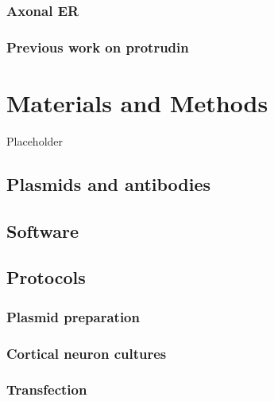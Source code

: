 \documentclass[
  12pt,
  a4paper,
]{book}
\begin{document}
\hypertarget{intro-ptdn-axonalER}{%
\subsection{Axonal ER}\label{intro-ptdn-axonalER}}

\hypertarget{previous-work-on-protrudin}{%
\subsection{Previous work on protrudin}\label{previous-work-on-protrudin}}

\hypertarget{METHODS}{%
\chapter*{Materials and Methods}\label{METHODS}}

Placeholder

\hypertarget{plasmids-and-antibodies}{%
\section{Plasmids and antibodies}\label{plasmids-and-antibodies}}

\hypertarget{software}{%
\section{Software}\label{software}}

\hypertarget{protocols}{%
\section{Protocols}\label{protocols}}

\hypertarget{plasmid-prep}{%
\subsection{Plasmid preparation}\label{plasmid-prep}}

\hypertarget{cortical-neuron-cultures}{%
\subsection{Cortical neuron cultures}\label{cortical-neuron-cultures}}

\hypertarget{transfection}{%
\subsection{Transfection}\label{transfection}}
\end{document}

